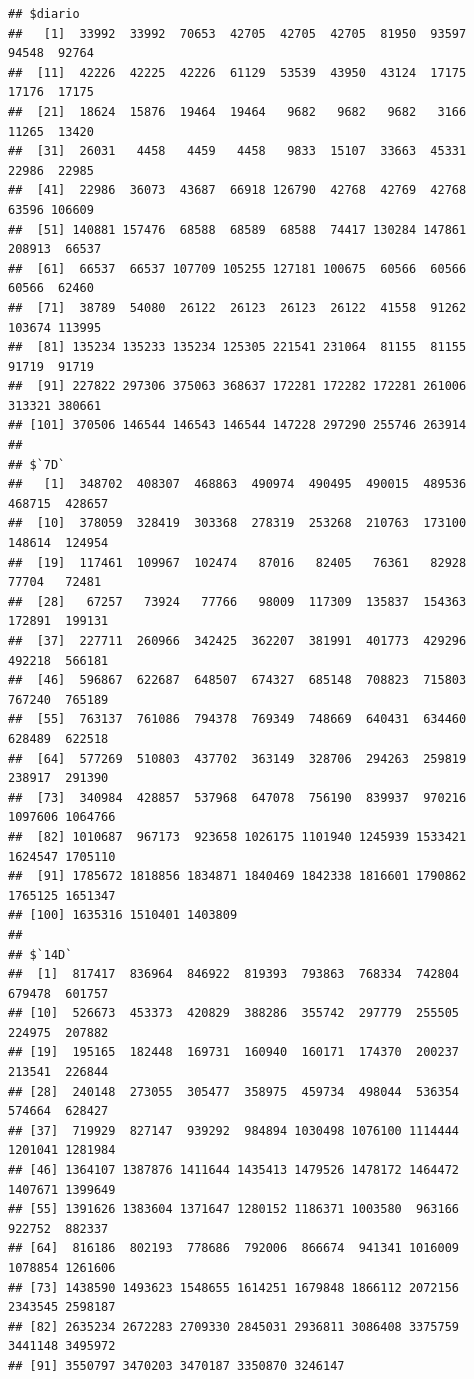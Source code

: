 \documentclass[11pt,]{book}
\begin{document}
\begin{verbatim}
## $diario
##   [1]  33992  33992  70653  42705  42705  42705  81950  93597  94548  92764
##  [11]  42226  42225  42226  61129  53539  43950  43124  17175  17176  17175
##  [21]  18624  15876  19464  19464   9682   9682   9682   3166  11265  13420
##  [31]  26031   4458   4459   4458   9833  15107  33663  45331  22986  22985
##  [41]  22986  36073  43687  66918 126790  42768  42769  42768  63596 106609
##  [51] 140881 157476  68588  68589  68588  74417 130284 147861 208913  66537
##  [61]  66537  66537 107709 105255 127181 100675  60566  60566  60566  62460
##  [71]  38789  54080  26122  26123  26123  26122  41558  91262 103674 113995
##  [81] 135234 135233 135234 125305 221541 231064  81155  81155  91719  91719
##  [91] 227822 297306 375063 368637 172281 172282 172281 261006 313321 380661
## [101] 370506 146544 146543 146544 147228 297290 255746 263914
## 
## $`7D`
##   [1]  348702  408307  468863  490974  490495  490015  489536  468715  428657
##  [10]  378059  328419  303368  278319  253268  210763  173100  148614  124954
##  [19]  117461  109967  102474   87016   82405   76361   82928   77704   72481
##  [28]   67257   73924   77766   98009  117309  135837  154363  172891  199131
##  [37]  227711  260966  342425  362207  381991  401773  429296  492218  566181
##  [46]  596867  622687  648507  674327  685148  708823  715803  767240  765189
##  [55]  763137  761086  794378  769349  748669  640431  634460  628489  622518
##  [64]  577269  510803  437702  363149  328706  294263  259819  238917  291390
##  [73]  340984  428857  537968  647078  756190  839937  970216 1097606 1064766
##  [82] 1010687  967173  923658 1026175 1101940 1245939 1533421 1624547 1705110
##  [91] 1785672 1818856 1834871 1840469 1842338 1816601 1790862 1765125 1651347
## [100] 1635316 1510401 1403809
## 
## $`14D`
##  [1]  817417  836964  846922  819393  793863  768334  742804  679478  601757
## [10]  526673  453373  420829  388286  355742  297779  255505  224975  207882
## [19]  195165  182448  169731  160940  160171  174370  200237  213541  226844
## [28]  240148  273055  305477  358975  459734  498044  536354  574664  628427
## [37]  719929  827147  939292  984894 1030498 1076100 1114444 1201041 1281984
## [46] 1364107 1387876 1411644 1435413 1479526 1478172 1464472 1407671 1399649
## [55] 1391626 1383604 1371647 1280152 1186371 1003580  963166  922752  882337
## [64]  816186  802193  778686  792006  866674  941341 1016009 1078854 1261606
## [73] 1438590 1493623 1548655 1614251 1679848 1866112 2072156 2343545 2598187
## [82] 2635234 2672283 2709330 2845031 2936811 3086408 3375759 3441148 3495972
## [91] 3550797 3470203 3470187 3350870 3246147
\end{verbatim}
\end{document}
